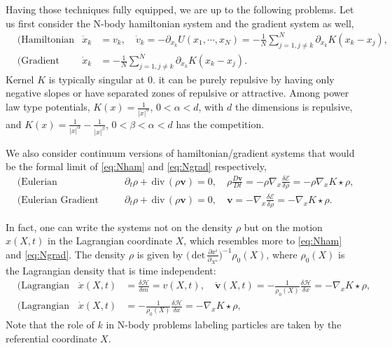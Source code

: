 \documentclass[a4paper,11pt]{article}
\def\div{\,\textrm{div}\,}
\def\det{\,\textrm{det}\,}
\def\E{\mathcal{E}}
\def\H{\mathcal{H}}
\begin{document}
Having those techniques fully equipped, we are up to the following problems. Let us first consider the N-body hamiltonian system and the gradient system as well,
\begin{align}
 &\text{(Hamiltonian Flow)} & \dot{x}_k &= v_k, \quad \dot{v}_k = -\partial_{x_k} U(x_1,\cdots,x_N) = - \frac{1}{N}\sum_{j=1,j\ne k}^N\partial_{x_k}K(x_k-x_j), \label{eq:Nham}\\
 &\text{(Gradient flow)} &\dot{x}_k &= - \frac{1}{N}\sum_{j=1,j\ne k}^N\partial_{x_k}K(x_k-x_j).  \label{eq:Ngrad}
\end{align}
Kernel $K$ is typically singular at $0$. it can be purely repulsive by having only negative slopes or have separated zones of repulsive or attractive. Among power law type potentials, $K(x)=\frac{1}{|x|^\alpha}$, $0<\alpha<d$, with $d$ the dimensions is repulsive, and $K(x)=\frac{1}{|x|^\alpha}-\frac{1}{|x|^\beta}$, $0<\beta<\alpha<d$ has the competition.

We also consider continuum versions of hamiltonian/gradient systems that would be the formal limit of \eqref{eq:Nham} and \eqref{eq:Ngrad} respectively,
\begin{align}
 &\text{(Eulerian Hamiltonian flow)} & &\partial_t \rho + \div (\rho \mathbf{v}) = 0, \quad\rho \frac{D \mathbf{v}}{Dt} = -\rho\nabla_x \frac{\delta\E}{\delta\rho} = -\rho\nabla_x K\star\rho,\\
 &\text{(Eulerian Gradient flow)} & &\partial_t \rho + \div (\rho \mathbf{v}) = 0, \quad \mathbf{v} = -\nabla_x\frac{\delta\E}{\delta\rho} =-\nabla_x K\star\rho. 
\end{align}

In fact, one can write the systems not on the density $\rho$ but on the motion $x(X,t)$ in the Lagrangian coordinate $X$, which resembles more to \eqref{eq:Nham} and \eqref{eq:Ngrad}. The density $\rho$ is given by $\Big(\det\frac{\partial x^i}{\partial_{X^\alpha}}\Big)^{-1}\rho_0(X)$, where $\rho_0(X)$ is the Lagrangian density that is time independent:
\begin{align}
 &\text{(Lagrangian Hamiltonian flow)} &\dot{x}(X,t) &= \frac{\delta\H}{\delta m}=v(X,t), \quad \dot{\mathbf{v}}(X,t) = -\frac{1}{\rho_0(X)}\frac{\delta\H}{\delta x}= -\nabla_x K\star\rho,\label{eq:Lham}\\
 &\text{(Lagrangian Gradient flow)} &\dot{x}(X,t) &= -\frac{1}{\rho_0(X)}\frac{\delta\H}{\delta x}= -\nabla_x K\star\rho,\label{eq:Lgrad}
\end{align}
Note that the role of $k$ in N-body problems labeling particles are taken by the referential coordinate $X$.
\end{document}
